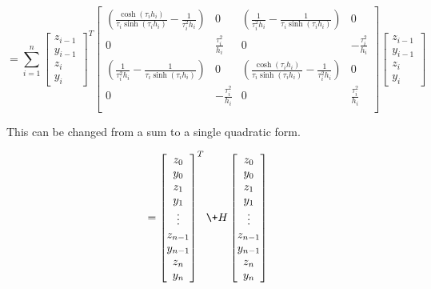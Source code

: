 \documentclass{article}
\begin{document}
\begin{equation}
    = \sum_{i=1}^{n} \begin{bmatrix}
        z_{i-1} \\ y_{i-1} \\ z_i \\ y_i
    \end{bmatrix}^T
    \begin{bmatrix}
        \left(\frac{\cosh(\tau_i h_i)}{\tau_i \sinh(\tau_i h_i)} - \frac{1}{\tau_i^2 h_i} \right) & 0 & \left( \frac{1}{\tau_i^2 h_i} - \frac{1}{\tau_i \sinh(\tau_i h_i)} \right) & 0 \\
        0 & \frac{\tau_i^2}{h_i} & 0 & -\frac{\tau_i^2}{h_i} \\
        \left(\frac{1}{\tau_i^2 h_i} - \frac{1}{\tau_i \sinh(\tau_i h_i)}\right) & 0 & \left(\frac{\cosh(\tau_i h_i)}{\tau_i \sinh(\tau_i h_i)} - \frac{1}{\tau_i^2 h_i} \right) & 0 \\
        0 & -\frac{\tau_i^2}{h_i} & 0 & \frac{\tau_i^2}{h_i} \\
    \end{bmatrix}
    \begin{bmatrix}
        z_{i-1} \\ y_{i-1} \\ z_i \\ y_i
    \end{bmatrix}
\end{equation}

This can be changed from a sum to a single quadratic form.

\begin{equation}
    = \begin{bmatrix}
        z_0 \\
        y_0 \\
        z_1 \\
        y_1 \\
        \vdots \\
        z_{n-1} \\
        y_{n-1} \\
        z_n \\
        y_n \\
    \end{bmatrix} ^T
    \+H   
    \begin{bmatrix}
        z_0 \\
        y_0 \\
        z_1 \\
        y_1 \\
        \vdots \\
        z_{n-1} \\
        y_{n-1} \\
        z_n \\
        y_n \\
    \end{bmatrix}
\end{equation}
\end{document}
